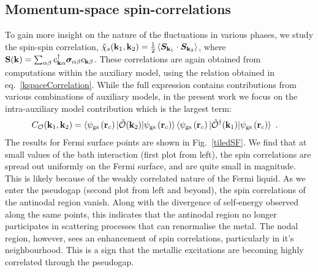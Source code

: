 \documentclass[reprint,hidelinks,onecolumn]{revtex4-2}
\begin{document}
\subsection{Momentum-space spin-correlations}
To gain more insight on the nature of the fluctuations in various phases, we study the spin-spin correlation, \(\tilde \chi_s({\bf k}_1, {\bf k}_2) = \frac{1}{2}\left<{\boldsymbol S}_{{\bf k}_1}\cdot {\boldsymbol S}_{{\bf k}_2}\right>\), where \({\bf S}({\bf k}) = \sum_{\alpha\beta}c^\dagger_{{\bf k}\alpha}{\boldsymbol \sigma}_{\alpha \beta}c_{{\bf k}\beta}\). These correlations are again obtained from computations within the auxiliary model, using the relation obtained in eq.~\ref{kspaceCorrelation}. While the full expression contains contributions from various combinations of auxiliary models, in the present work we focus on the intra-auxiliary model contribution which is the largest term:
\begin{equation}\begin{aligned}
	C_{\mathcal{O}}({\bf k}_1,{\bf k}_2) &= \braket{\psi_\text{gs}\left({\bf r}_c\right) | \mathcal{\tilde O}({\bf k}_2) | \psi_\text{gs}\left({\bf r}_c\right)}\braket{\psi_\text{gs}\left({\bf r}_c\right) | \mathcal{\tilde O}^\dagger({\bf k}_1) | \psi_\text{gs}\left({\bf r}_c\right)}~.
\end{aligned}\end{equation}
The results for Fermi surface points are shown in Fig.~\ref{tiledSF}. We find that at small values of the bath interaction (first plot from left), the spin correlations are spread out uniformly on the Fermi surface, and are quite small in magnitude. This is likely because of the weakly correlated nature of the Fermi liquid. As we enter the pseudogap (second plot from left and beyond), the spin correlations of the antinodal region vanish. Along with the divergence of self-energy observed along the same points, this indicates that the antinodal region no longer participates in scattering processes that can renormalise the metal. The nodal region, however, sees an enhancement of spin correlations, particularly in it's neighbourhood. This is a sign that the metallic excitations are becoming highly correlated through the pseudogap.
\end{document}
